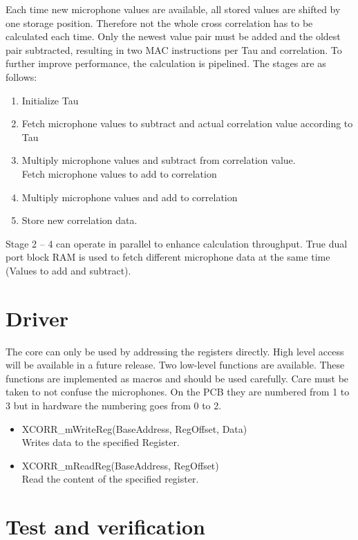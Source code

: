Each time new microphone values are available, all stored values are shifted by one storage position.
Therefore not the whole cross correlation has to be calculated each time.
Only the newest value pair must be added and the oldest pair subtracted, resulting in two MAC instructions per Tau and correlation.
To further improve performance, the calculation is pipelined.
The stages are as follows:
\begin{enumerate}
	\item Initialize Tau
	\item Fetch microphone values to subtract and actual correlation value according to Tau
	\item Multiply microphone values and subtract from correlation value.\\
		Fetch microphone values to add to correlation
	\item Multiply microphone values and add to correlation
	\item Store new correlation data.
\end{enumerate}
Stage 2 -- 4 can operate in parallel to enhance calculation throughput.
True dual port block RAM is used to fetch different microphone data at the same time (Values to add and subtract).


\section{Driver}
\label{sec::driver}

The core can only be used by addressing the registers directly.
High level access will be available in a future release.
Two low-level functions are available.
These functions are implemented as macros and should be used carefully.
Care must be taken to not confuse the microphones. 
On the PCB they are numbered from 1 to 3 but in hardware the numbering goes from 0 to 2.

\begin{itemize}
	\item XCORR\_mWriteReg(BaseAddress, RegOffset, Data) \\
		Writes data to the specified Register. 
	\item XCORR\_mReadReg(BaseAddress, RegOffset) \\		
		Read the content of the specified register.
\end{itemize}

\section{Test and verification}
\label{sec::test}

